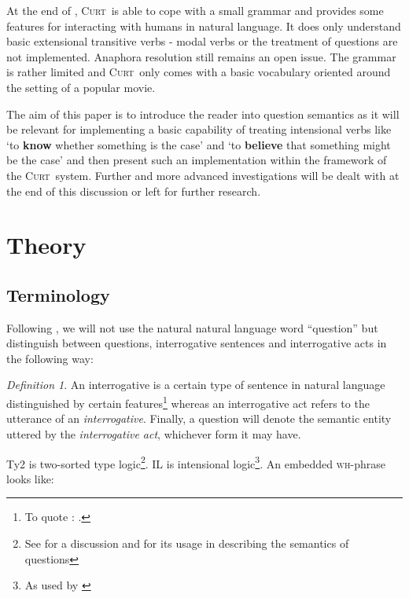 \documentclass[a4paper,fontsize=12pt]{article}
\newcommand{\abbr}{\textsf} %
\newcommand{\stress}{\textbf} %
\newcommand{\term}{\textsf} %
\newcommand{\pn}{\textsc} %
\newcommand{\wh}{\textsc{wh}} %
\newcommand{\curt}{\pn{Curt}\mbox{ }}
\theoremstyle{remark} \newtheorem*{termin}{Definition} %
\begin{document}
At the end of \cite{blackburnbos:cl1}, \curt is able to cope with a small
grammar and provides some features for interacting with humans in natural
language. It does only understand basic extensional transitive verbs - modal
verbs or the treatment of questions are not implemented. Anaphora resolution
still remains an open issue. The grammar is rather limited and \curt only comes
with a basic vocabulary oriented around the setting of a popular movie.

The aim of this paper is to introduce the reader into question semantics as it
will be relevant for implementing a basic capability of treating intensional
verbs like `to \stress{know} whether something is the case' and `to
\stress{believe} that something might be the case' and then present such an
implementation within the framework of the \curt system. Further and more
advanced investigations will be dealt with at the end of this discussion or left
for further research.

\section{Theory}

\subsection{Terminology}

Following \cite{gs:q}, we will not use the natural natural language word
``question'' but distinguish between \term{questions},
\term{interrogative sentences} and \term{interrogative acts} in the following
way:

\begin{termin}
  An \term{interrogative} is a certain type of sentence in natural language
  distinguished by certain features\footnote{To quote \cite{gs:q}: .}
  whereas an \term{interrogative act} refers to the utterance of an
  \emph{interrogative}. Finally, a 
  \term{question} will denote the semantic entity uttered by the
  \emph{interrogative act}, whichever form it may have.
\end{termin}

\abbr{Ty2} is two-sorted type logic\footnote{See \cite{gallin:ty2} for a
discussion and \cite{gs:sqpa} for its usage in describing the semantics of
questions}. \abbr{IL} is intensional logic\footnote{As used by \cite{ptq}}. 
An embedded \wh-phrase looks
like:%
\end{document}
